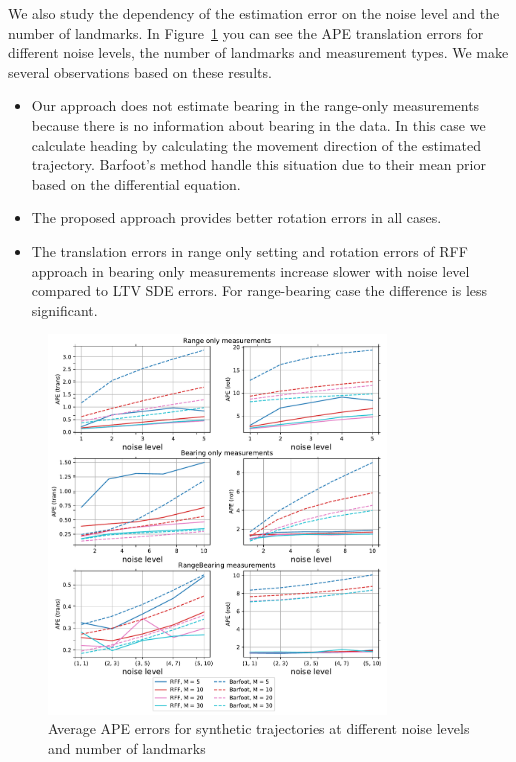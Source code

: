 We also study the dependency of the estimation error on the noise level
and the number of landmarks.
In Figure~\ref{fig:synthetic_noise_distr}
you can see the APE translation errors
for different noise levels, the number of landmarks and measurement types.
We make several observations based on these results.
\begin{itemize}
    \item Our approach does not estimate bearing in the range-only measurements because there is no information about bearing in the data.
    In this case we calculate heading by
    calculating the movement direction of the estimated trajectory.
    Barfoot's method handle this situation due to their mean prior based on
    the differential equation.

    \item The proposed approach provides better rotation errors in all cases.

    \item The translation errors in range only
    setting and rotation errors of RFF
    approach in bearing only measurements
    increase slower with noise level compared
    to LTV SDE errors.
    For range-bearing case the difference is less significant.
\end{itemize}

\begin{figure}
    \centering
    \includegraphics[width=0.8\textwidth]{figures/slam/synthetic_noise_distr.pdf}
    \caption{Average APE errors for synthetic trajectories at different noise levels
    and number of landmarks}
    \label{fig:synthetic_noise_distr}
\end{figure}

